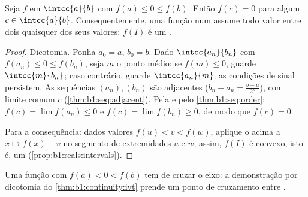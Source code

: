 \begin{theorem}\label{thm:b1:continuity:ivt}
Seja $f$  em $\intcc{a}{b}$ com $f(a) \leq 0 \leq
f(b)$. Então $f(c) = 0$ para algum $c \in \intcc{a}{b}$.
Consequentemente, uma função  num  assume todo valor
entre dois quaisquer dos seus valores: $f(I)$ é um
.
\end{theorem}

\begin{proof}
Dicotomia. Ponha $a_0 = a$, $b_0 = b$. Dado $\intcc{a_n}{b_n}$ com
$f(a_n) \leq 0 \leq f(b_n)$, seja $m$ o ponto médio: se $f(m) \leq
0$, guarde $\intcc{m}{b_n}$; caso contrário, guarde $\intcc{a_n}{m}$; as
condições de sinal persistem. As sequências $(a_n), (b_n)$ são adjacentes
($b_n -
a_n = \frac{b-a}{2^n}$), com limite comum $c$
(\cref{thm:b1:seq:adjacent}). Pela  e pelo
\cref{thm:b1:seq:order}: $f(c) = \lim f(a_n) \leq 0$ e $f(c) =
\lim f(b_n) \geq 0$, de modo que $f(c) = 0$.

Para a consequência: dados valores $f(u) < v < f(w)$, aplique o acima
a $x \mapsto f(x) - v$ no segmento de extremidades $u$ e $w$;
assim, $f(I)$ é convexo, isto é, um 
(\cref{prop:b1:reals:intervals}).
\end{proof}

\begin{omfigure}

{\small Uma função  com $f(a) < 0 < f(b)$ tem de cruzar o
eixo: a demonstração por dicotomia do \cref{thm:b1:continuity:ivt} prende um
ponto de cruzamento entre .}
\end{omfigure}


